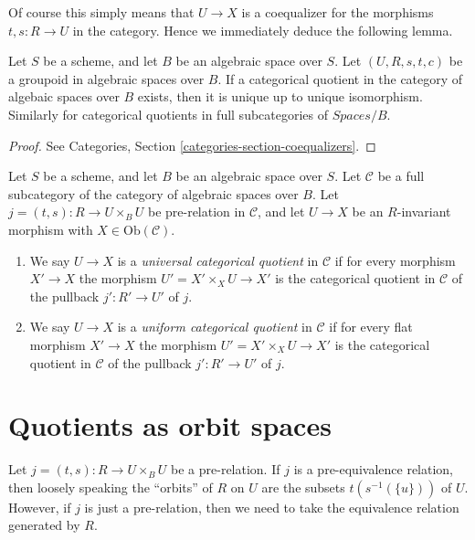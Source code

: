 \noindent
Of course this simply means that $U \to X$ is a coequalizer for the
morphisms $t, s : R \to U$ in the category. Hence we immediately
deduce the following lemma.

\begin{lemma}
\label{lemma-categorical-unique}
Let $S$ be a scheme, and let $B$ be an algebraic space over $S$.
Let $(U, R, s, t, c)$ be a groupoid in algebraic spaces over $B$.
If a categorical quotient in the category of algebaic spaces
over $B$ exists, then it is unique up to unique isomorphism.
Similarly for categorical quotients in full subcategories of
$\textit{Spaces}/B$.
\end{lemma}

\begin{proof}
See Categories, Section \ref{categories-section-coequalizers}.
\end{proof}

\begin{definition}
\label{definition-universal-categorical}
Let $S$ be a scheme, and let $B$ be an algebraic space over $S$.
Let $\mathcal{C}$ be a full subcategory of the category of algebraic
spaces over $B$. Let $j = (t, s) : R \to U \times_B U$ be pre-relation in
$\mathcal{C}$, and let $U \to X$ be an $R$-invariant morphism with
$X \in \text{Ob}(\mathcal{C})$.
\begin{enumerate}
\item We say $U \to X$ is a {\it universal categorical quotient}
in $\mathcal{C}$ if for every morphism $X' \to X$ the morphism
$U' = X' \times_X U \to X'$ is the categorical quotient in $\mathcal{C}$
of the pullback $j' : R' \to U'$ of $j$.
\item We say $U \to X$ is a {\it uniform categorical quotient}
in $\mathcal{C}$ if for every flat morphism $X' \to X$ the morphism
$U' = X' \times_X U \to X'$ is the categorical quotient in $\mathcal{C}$
of the pullback $j' : R' \to U'$ of $j$.
\end{enumerate}
\end{definition}




\section{Quotients as orbit spaces}
\label{section-orbits}

\noindent
Let $j = (t, s) : R \to U \times_B U$ be a pre-relation.
If $j$ is a pre-equivalence relation, then loosely speaking
the ``orbits'' of $R$ on $U$
are the subsets $t(s^{-1}(\{u\}))$ of $U$. However, if $j$ is just a
pre-relation, then we need to take the equivalence relation generated
by $R$.

